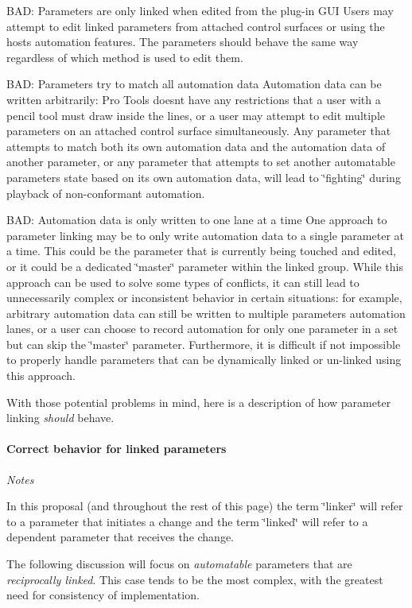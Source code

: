\begin{DoxyItemize}
\item B\+AD\+: Parameters are only linked when edited from the plug-\/in G\+UI  Users may attempt to edit linked parameters from attached control surfaces or using the host\textquotesingle{}s automation features. The parameters should behave the same way regardless of which method is used to edit them.  
\item B\+AD\+: Parameters try to match all automation data  Automation data can be written arbitrarily\+: Pro Tools doesn\textquotesingle{}t have any restrictions that a user with a pencil tool must draw inside the lines, or a user may attempt to edit multiple parameters on an attached control surface simultaneously. Any parameter that attempts to match both its own automation data and the automation data of another parameter, or any parameter that attempts to set another automatable parameter\textquotesingle{}s state based on its own automation data, will lead to \char`\"{}fighting\char`\"{} during playback of non-\/conformant automation.  
\item B\+AD\+: Automation data is only written to one lane at a time  One approach to parameter linking may be to only write automation data to a single parameter at a time. This could be the parameter that is currently being touched and edited, or it could be a dedicated \char`\"{}master\char`\"{} parameter within the linked group. While this approach can be used to solve some types of conflicts, it can still lead to unnecessarily complex or inconsistent behavior in certain situations\+: for example, arbitrary automation data can still be written to multiple parameters\textquotesingle{} automation lanes, or a user can choose to record automation for only one parameter in a set but can skip the \char`\"{}master\char`\"{} parameter. Furthermore, it is difficult if not impossible to properly handle parameters that can be dynamically linked or un-\/linked using this approach.  
\end{DoxyItemize}

With those potential problems in mind, here is a description of how parameter linking {\itshape should} behave.\hypertarget{a00824_linkedParamters_behavior_correct}{}\paragraph{Correct behavior for linked parameters}\label{a00824_linkedParamters_behavior_correct}
{\itshape Notes}
\begin{DoxyItemize}
\item In this proposal (and throughout the rest of this page) the term \char`\"{}linker\char`\"{} will refer to a parameter that initiates a change and the term \char`\"{}linked\char`\"{} will refer to a dependent parameter that receives the change.
\item The following discussion will focus on {\itshape automatable} parameters that are {\itshape reciprocally linked}. This case tends to be the most complex, with the greatest need for consistency of implementation.
\end{DoxyItemize}

